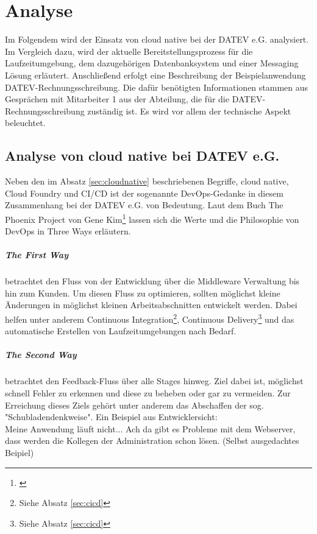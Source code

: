 \chapter{Analyse}\label{ch:analyse}
Im Folgendem wird der Einsatz von cloud native bei der DATEV e.G. analysiert.
Im Vergleich dazu, wird der aktuelle Bereitstellungsprozess für die Laufzeitumgebung, dem dazugehörigen Datenbanksystem und einer Messaging Lösung erläutert.
Anschließend erfolgt eine Beschreibung der Beispielanwendung \glqq DATEV-Rechnungsschreibung\grqq.
Die dafür benötigten Informationen stammen aus Gesprächen mit Mitarbeiter 1 aus der Abteilung, die für die DATEV-Rechnungsschreibung zuständig ist.
Es wird vor allem der technische Aspekt beleuchtet.

\section{Analyse von cloud native bei DATEV e.G.}\label{sec:analysecloud}
Neben den im Absatz \ref{sec:cloudnative} beschriebenen Begriffe, \glqq cloud native\grqq, \glqq Cloud Foundry\grqq{} und \glqq CI/CD\grqq{} ist der sogenannte \glqq DevOps\grqq-Gedanke in diesem Zusammenhang bei der DATEV e.G. von Bedeutung.
Laut dem Buch \glqq The Phoenix Project\grqq{} von Gene Kim\footnote{\cite{Kim.2014}} lassen sich die Werte und die Philosophie von DevOps in \glqq Three Ways\grqq{} erläutern.

\paragraph{\glqq The First Way\grqq} betrachtet den Fluss von der Entwicklung über die Middleware Verwaltung bis hin zum Kunden.
Um diesen Fluss zu optimieren, sollten möglichst kleine Änderungen in möglichst kleinen Arbeitsabschnitten entwickelt werden.
Dabei helfen unter anderem Continuous Integration\footnote{Siehe Absatz \ref{sec:cicd}}, Continuous Delivery\footnote{Siehe Absatz \ref{sec:cicd}} und das automatische Erstellen von Laufzeitumgebungen nach Bedarf.

\paragraph{\glqq The Second Way\grqq} betrachtet den Feedback-Fluss über alle Stages hinweg.
Ziel dabei ist, möglichst schnell Fehler zu erkennen und diese zu beheben oder gar zu vermeiden.
Zur Erreichung dieses Ziels gehört unter anderem das Abschaffen der sog. "Schubladendenkweise".
Ein Beispiel aus Entwicklersicht:\\
\glqq Meine Anwendung läuft nicht... Ach da gibt es Probleme mit dem Webserver, dass werden die Kollegen der Administration schon lösen\grqq. (Selbst ausgedachtes Beipiel)

